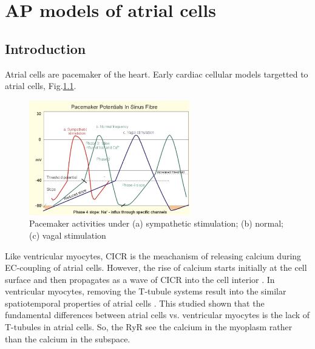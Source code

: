  
\chapter{AP models of atrial cells}
\label{chap:ap-models-atrial}

\section{Introduction}

Atrial cells are pacemaker of the heart. Early cardiac cellular models targetted
to atrial cells, Fig.\ref{fig:SA_AP}.

\begin{figure}[hbt]
  \centerline{\includegraphics[height=5cm,
    angle=0]{./images/SA_AP.eps}}
  \caption{Pacemaker activities under (a) sympathetic stimulation; (b) normal;
  (c) vagal stimulation}
\label{fig:SA_AP}
\end{figure}

Like ventricular myocytes, CICR is the meachanism of releasing calcium during
EC-coupling of atrial cells. However, the rise of calcium starts initially at
the cell surface and then propagates as a wave of CICR into the cell interior
\citep{huser1996, mackenzie2001, tanaami2005}. In ventricular myocytes, removing
the T-tubule systems result into the similar spatiotemporal properties of atrial
cells \citep{brette2002}. This studied shown that the fundamental differences
between atrial cells vs. ventricular myocytes is the lack of T-tubules in atrial
cells. So, the RyR see the calcium in the myoplasm rather than the calcium in
the subspace. 

